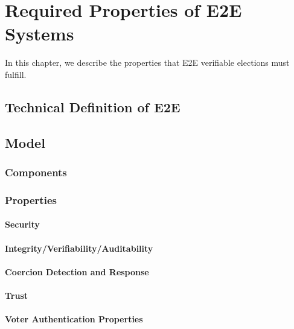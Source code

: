 

\chapter{Required Properties of E2E Systems}

In this chapter, we describe the properties that E2E verifiable
elections must fulfill. 

\section{Technical Definition of E2E}

\section{Model}

\subsection{Components}

\subsection{Properties}

\subsubsection{Security}
\subsubsection{Integrity/Verifiability/Auditability}
\subsubsection{Coercion Detection and Response}
\subsubsection{Trust}
\subsubsection{Voter Authentication Properties}

